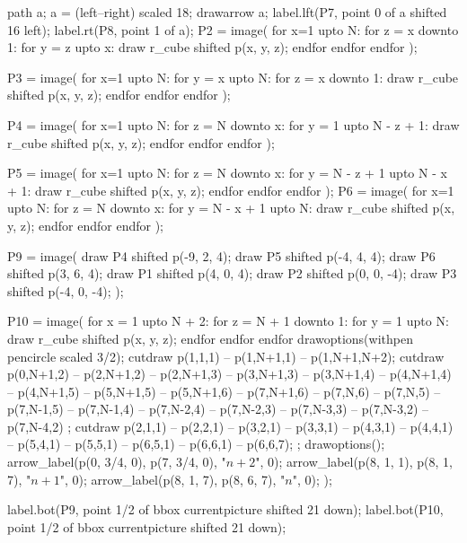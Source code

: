 \documentclass[oneside]{scrbook}
\begin{document}
path a; a = (left--right) scaled 18;
drawarrow a;
label.lft(P7, point 0 of a shifted 16 left);
label.rt(P8, point 1 of a);
P2 = image(
for x=1 upto N:
    for z = x downto 1:
        for y = z upto x:
            draw r_cube shifted p(x, y, z);
        endfor
    endfor
endfor
);

P3 = image(
for x=1 upto N:
    for y = x upto N:
        for z = x downto 1:
            draw r_cube shifted p(x, y, z);
        endfor
    endfor
endfor
);

P4 = image(
for x=1 upto N:
    for z = N downto x:
        for y = 1 upto N - z + 1:
            draw r_cube shifted p(x, y, z);
        endfor
    endfor
endfor
);

P5 = image(
for x=1 upto N:
    for z = N downto x:
        for y = N - z + 1 upto N - x + 1:
            draw r_cube shifted p(x, y, z);
        endfor
    endfor
endfor
);
P6 = image(
for x=1 upto N:
    for z = N downto x:
        for y = N - x + 1 upto N:
            draw r_cube shifted p(x, y, z);
        endfor
    endfor
endfor
);


P9 = image(
    draw P4 shifted p(-9, 2, 4);
    draw P5 shifted p(-4, 4, 4);
    draw P6 shifted p(3, 6, 4);
    draw P1 shifted p(4, 0, 4);
    draw P2 shifted p(0, 0, -4);
    draw P3 shifted p(-4, 0, -4);
);

P10 = image(
for x = 1 upto N + 2:
    for z = N + 1 downto 1:
        for y = 1 upto N:
            draw r_cube shifted p(x, y, z);
        endfor
    endfor
endfor
drawoptions(withpen pencircle scaled 3/2);
cutdraw p(1,1,1) -- p(1,N+1,1) -- p(1,N+1,N+2);
cutdraw p(0,N+1,2) -- p(2,N+1,2) -- p(2,N+1,3)
                -- p(3,N+1,3) -- p(3,N+1,4)
                -- p(4,N+1,4) -- p(4,N+1,5)
                -- p(5,N+1,5) -- p(5,N+1,6)
                -- p(7,N+1,6)
                -- p(7,N,6) -- p(7,N,5)
                -- p(7,N-1,5) -- p(7,N-1,4)
                -- p(7,N-2,4) -- p(7,N-2,3)
                -- p(7,N-3,3) -- p(7,N-3,2)
                -- p(7,N-4,2) ;
cutdraw p(2,1,1) -- p(2,2,1)
     -- p(3,2,1) -- p(3,3,1)
     -- p(4,3,1) -- p(4,4,1)
     -- p(5,4,1) -- p(5,5,1)
     -- p(6,5,1) -- p(6,6,1) -- p(6,6,7);
    ;
drawoptions();
arrow_label(p(0, 3/4, 0), p(7, 3/4, 0), "$\scriptstyle n+2$", 0);
arrow_label(p(8, 1, 1), p(8, 1, 7), "$\scriptstyle n+1$", 0);
arrow_label(p(8, 1, 7), p(8, 6, 7), "$\scriptstyle n$", 0);
);


label.bot(P9, point 1/2 of bbox currentpicture shifted 21 down);
label.bot(P10, point 1/2 of bbox currentpicture shifted 21 down);
\end{document}
